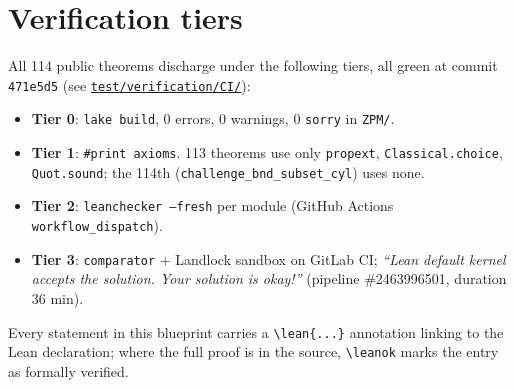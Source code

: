 \section{Verification tiers}

All 114 public theorems discharge under the following tiers, all green at
commit \texttt{471e5d5} (see
\href{https://github.com/Zetetic-Dhruv/zetesis-puremath/tree/main/test/verification/CI}{\texttt{test/verification/CI/}}):

\begin{itemize}
  \item \textbf{Tier 0}: \texttt{lake build}, 0 errors, 0 warnings, 0
    \texttt{sorry} in \texttt{ZPM/}.
  \item \textbf{Tier 1}: \texttt{\#print axioms}. 113 theorems use
    only \texttt{propext}, \texttt{Classical.choice}, \texttt{Quot.sound};
    the 114th (\texttt{challenge\_bnd\_subset\_cyl}) uses none.
  \item \textbf{Tier 2}: \texttt{leanchecker --fresh} per module (GitHub
    Actions \texttt{workflow\_dispatch}).
  \item \textbf{Tier 3}: \texttt{comparator} + Landlock sandbox on
    GitLab CI; \emph{``Lean default kernel accepts the solution. Your
    solution is okay!''} (pipeline \#2463996501, duration 36 min).
\end{itemize}

Every statement in this blueprint carries a \texttt{\textbackslash lean\{...\}}
annotation linking to the Lean declaration; where the full proof is in
the source, \texttt{\textbackslash leanok} marks the entry as formally
verified.
